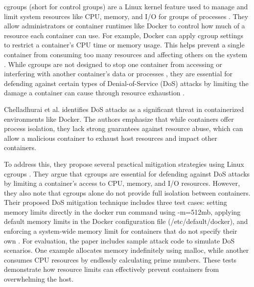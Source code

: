\documentclass[12pt]{report}
\begin{document}
\begin{doublespace}
cgroups (short for control groups) are a Linux kernel feature used to manage and limit system resources like CPU, memory, and I/O for groups of processes \cite{chelladhurai2016securing}. They allow administrators or container runtimes like Docker to control how much of a resource each container can use. For example, Docker can apply cgroup settings to restrict a container’s CPU time or memory usage. This helps prevent a single container from consuming too many resources and affecting others on the system \cite{chelladhurai2016securing}. While cgroups are not designed to stop one container from accessing or interfering with another container’s data or processes \cite{chelladhurai2016securing}, they are essential for defending against certain types of Denial-of-Service (DoS) attacks by limiting the damage a container can cause through resource exhaustion \cite{chelladhurai2016securing}.

Chelladhurai et al. \cite{chelladhurai2016securing} identifies DoS attacks as a significant threat in containerized environments like Docker. The authors emphasize that while containers offer process isolation, they lack strong guarantees against resource abuse, which can allow a malicious container to exhaust host resources and impact other containers.

To address this, they propose several practical mitigation strategies using Linux cgroups \cite{chelladhurai2016securing}. They argue that cgroups are essential for defending against DoS attacks by limiting a container’s access to CPU, memory, and I/O resources. However, they also note that cgroups alone do not provide full isolation between containers. Their proposed DoS mitigation technique includes three test cases: setting memory limits directly in the docker run command using -m=512mb, applying default memory limits in the Docker configuration file (/etc/default/docker), and enforcing a system-wide memory limit for containers that do not specify their own \cite{chelladhurai2016securing}. For evaluation, the paper includes sample attack code to simulate DoS scenarios. One example allocates memory indefinitely using malloc, while another consumes CPU resources by endlessly calculating prime numbers. These tests demonstrate how resource limits can effectively prevent containers from overwhelming the host.


\end{doublespace}
\end{document}
